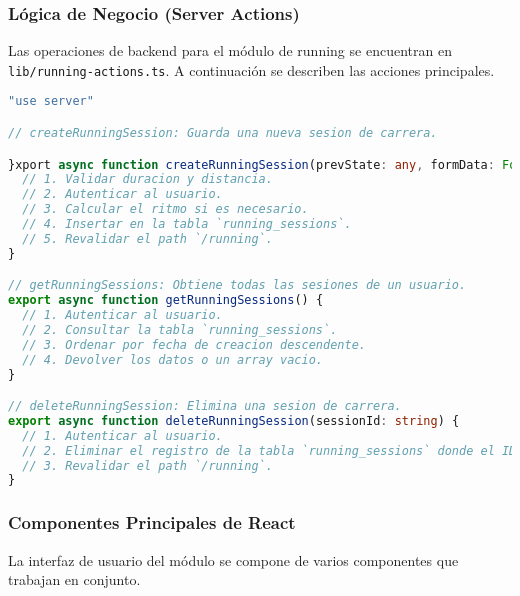 \documentclass[12pt,a4paper]{article}
\begin{document}
\subsubsection{Lógica de Negocio (Server Actions)}

Las operaciones de backend para el módulo de running se encuentran en \texttt{lib/running-actions.ts}. A continuación se describen las acciones principales.

\begin{lstlisting}[language=typescript, caption={Funciones principales en `running-actions.ts`}]
"use server"

// createRunningSession: Guarda una nueva sesion de carrera.

}xport async function createRunningSession(prevState: any, formData: FormData) {
  // 1. Validar duracion y distancia.
  // 2. Autenticar al usuario.
  // 3. Calcular el ritmo si es necesario.
  // 4. Insertar en la tabla `running_sessions`.
  // 5. Revalidar el path `/running`.
}

// getRunningSessions: Obtiene todas las sesiones de un usuario.
export async function getRunningSessions() {
  // 1. Autenticar al usuario.
  // 2. Consultar la tabla `running_sessions`.
  // 3. Ordenar por fecha de creacion descendente.
  // 4. Devolver los datos o un array vacio.
}

// deleteRunningSession: Elimina una sesion de carrera.
export async function deleteRunningSession(sessionId: string) {
  // 1. Autenticar al usuario.
  // 2. Eliminar el registro de la tabla `running_sessions` donde el ID y el user_id coincidan.
  // 3. Revalidar el path `/running`.
}
\end{lstlisting}

\subsubsection{Componentes Principales de React}

La interfaz de usuario del módulo se compone de varios componentes que trabajan en conjunto.
\end{document}
